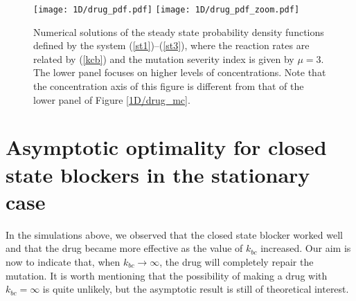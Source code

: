 \begin{figure}[p]\centering
\vbox{
\texttt{[image: 1D/drug\_pdf.pdf]}
\texttt{[image: 1D/drug\_pdf\_zoom.pdf]}
}
\caption{Numerical solutions of the steady state probability density functions defined by the system (\ref{st1})--(\ref{st3}), 
 where the reaction rates are related by (\ref{kcb}) and the mutation severity index is given by $\mu=3$. The lower panel focuses on higher levels of concentrations. Note that the concentration axis of this figure is different from that of the lower panel of Figure \ref{1D/drug_mc}. \label{1D/drug_pdf}}
\end{figure}

\section{Asymptotic optimality for closed state blockers in the stationary case \label{asymptotic}}

In the simulations above, we observed that the closed state blocker worked well and that the drug became more effective as the value of $k_{bc}$ increased.  Our aim is now to indicate that, when $k_{bc}\rightarrow \infty$, the drug will completely repair the mutation. 
It is worth mentioning that the possibility of making a drug with $k_{bc}=\infty$ is quite unlikely, but the asymptotic result is still of theoretical interest.

